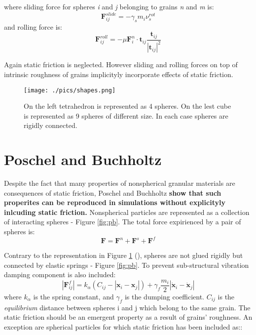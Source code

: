 \documentclass[10pt,a4paper]{article}
\begin{document}
where sliding force for spheres \textit{i} and \textit{j} belonging to grains \textit{n} and \textit{m} is:
\begin{equation}
 \mathbf{F}^{slide}_{ij} = -\gamma_s m_i \nu^{rot}_s
\end{equation}
and rolling force is:
\begin{equation}
 \mathbf{F}^{roll}_{ij} = -\mu\mathbf{F}^{n}_{i} \cdot \mathbf{t}_{ij} \frac{ \mathbf{t}_{ij}} { |\mathbf{t}_{ij}|^2 }
\end{equation}

Again static friction is neglected. %
However sliding and rolling forces on top of intrinsic roughness of grains implicityly incorporate effects of static friction.

\begin{figure}[tb]
\centering
\texttt{[image: ./pics/shapes.png]}
\caption{On the left tetrahedron is represented as 4 spheres. On the lest cube is represented as 9 spheres of different size. In each case spheres are rigidly connected.}
\label{fig:shapes}
\end{figure}

\section{Poschel and Buchholtz \cite{pb93, pb94, pb95}}
Despite the fact that many properties of nonspherical granular materials are consequences of static friction,
Poschel and Buchholtz \textbf{show that such properites can be reproduced in simulations without explicityly inlcuding static friction.}
Nonspherical particles are represented as a collection of interacting spheres - Figure \ref{fig:pb}. 
The total force expirienced by a pair of spheres is:
\begin{equation}
 \mathbf{F} = \mathbf{F}^{n} + \mathbf{F}^{s} + \mathbf{F}^{f}
\end{equation}

Contrary to the representation in Figure \ref{fig:shapes} (\cite{sok93}), spheres are not glued rigidly but connected by elastic springs - Figure \ref{fig:pb}.
To prevent sub-structural vibration damping component is also included:
\begin{equation}
 |\mathbf{F}^{f}_{ij}| =k_\alpha \left(C_{ij} -  |\mathbf{x}_{i} - \mathbf{x}_j| \right) + \gamma_{f} \frac{m_i}{2} |\dot{\mathbf{x}}_{i} - \dot{\mathbf{x}}_j|
\end{equation}
where $k_\alpha$ is the spring constant, and $\gamma_{f}$ is the dumping coefficient. $C_{ij}$ is the \textit{equilibrium} distance between spheres i and j
which belong to the same grain.
The static friction should be an emergent property as a result of grains' roughness. 
An exception are spherical particles for which static friction has been included as:\cite{cs79, herr93, herr94}:
 
\end{document}

